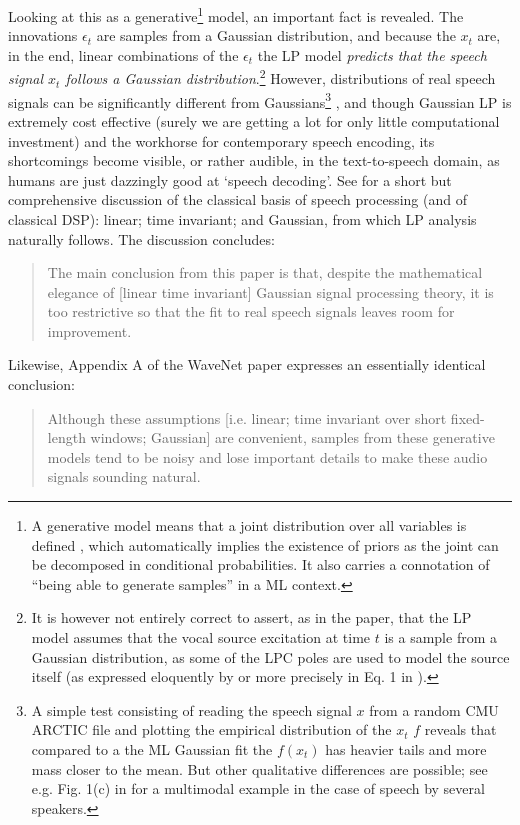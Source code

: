 \begin{chapterappendices}{5}
Looking at this as a generative\footnote{%
	A generative model means that a joint distribution over all variables is defined \citep{MacKay2005}, which automatically implies the existence of priors as the joint can be decomposed in conditional probabilities.
	It also carries a connotation of ``being able to generate samples'' in a ML context.
}
model, an important fact is revealed.
The innovations $\epsilon_t$ are samples from a Gaussian distribution, and because the $x_t$ are, in the end, linear combinations of the $\epsilon_t$ the LP model \emph{predicts that the speech signal $x_t$ follows a Gaussian distribution}.\footnote{%
	It is however not entirely correct to assert, as in the paper, that the LP model assumes that the vocal source excitation at time $t$ is a sample from a Gaussian distribution, as some of the LPC poles are used to model the source itself (as expressed eloquently by \citep[p.~ 107]{Schroeder1999} or more precisely in Eq.  1 in \citep{Atal1971}).
}
However, distributions of real speech signals can be significantly different from Gaussians\footnote{%
	A simple test consisting of reading the speech signal $x$ from a random CMU ARCTIC file and plotting the empirical distribution of the $x_t$ $f$ reveals that compared to a the ML Gaussian fit the $f(x_t)$ has heavier tails and more mass closer to the mean.
	But other qualitative differences are possible; see e.g. Fig. 1(c) in \citep{Little2011} for a multimodal example in the case of speech by several speakers.
}
\citep{Little2006a,Little2011}, and though Gaussian LP is extremely cost effective (surely we are getting a lot for only little computational investment) and the workhorse for contemporary speech encoding, its shortcomings become visible, or rather audible, in the text-to-speech domain, as humans are just dazzingly good at `speech decoding'.
See \citep{Little2011} for a short but comprehensive discussion of the classical basis of speech processing (and of classical DSP): linear; time invariant; and Gaussian, from which LP analysis naturally follows.
The discussion concludes:
\begin{quote}
	The main conclusion from this paper is that, despite the mathematical elegance of [linear time invariant] Gaussian signal processing theory, it is too restrictive so that the fit to real speech signals leaves room for improvement.
\end{quote}
Likewise, Appendix A of the WaveNet paper expresses an essentially identical conclusion:
\begin{quote}
	Although these assumptions [i.e. linear; time invariant over short fixed-length windows; Gaussian] are convenient, samples from these generative models tend to be noisy and lose important details to make these audio signals sounding natural.

\end{quote}
\end{chapterappendices}

